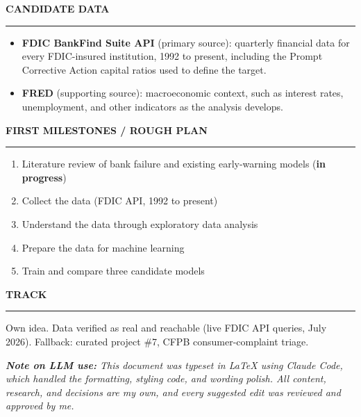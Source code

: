 \documentclass[11pt,letterpaper]{article}
\newcommand{\sectionhead}[1]{%
  \vspace{6pt}%
  {\sffamily\bfseries\fontsize{9.5}{12}\selectfont\color{navy}\MakeUppercase{#1}}\par
  \vspace{-9pt}\textcolor{hairline}{\rule{\textwidth}{0.5pt}}\par\vspace{0pt}}
\newcommand{\answer}[1]{#1\par\vspace{3pt}}
\begin{document}
\sectionhead{Candidate data}
\answer{\begin{itemize}[topsep=1pt,itemsep=1pt,leftmargin=14pt,label=\textcolor{navy}{\footnotesize\textbullet}]
  \item \textbf{FDIC BankFind Suite API} (primary source): quarterly financial data for every FDIC-insured institution, 1992 to present, including the Prompt Corrective Action capital ratios used to define the target.
  \item \textbf{FRED} (supporting source): macroeconomic context, such as interest rates, unemployment, and other indicators as the analysis develops.
\end{itemize}}

\sectionhead{First milestones / rough plan}
\answer{\begin{enumerate}[topsep=1pt,itemsep=1pt,leftmargin=16pt,label=\textcolor{navy}{\bfseries\arabic*.}]
  \item Literature review of bank failure and existing early-warning models (\textbf{in progress})
  \item Collect the data (FDIC API, 1992 to present)
  \item Understand the data through exploratory data analysis
  \item Prepare the data for machine learning
  \item Train and compare three candidate models
\end{enumerate}}

\begin{samepage}
\sectionhead{Track}
\answer{Own idea. Data verified as real and reachable (live FDIC API queries, July 2026). Fallback: curated project \#7, CFPB consumer-complaint triage.}
\end{samepage}

\vspace{2pt}
{\small\itshape\color{midgray}\textbf{Note on LLM use:} This document was typeset in LaTeX using Claude Code, which handled the formatting, styling code, and wording polish. All content, research, and decisions are my own, and every suggested edit was reviewed and approved by me.}
\end{document}
